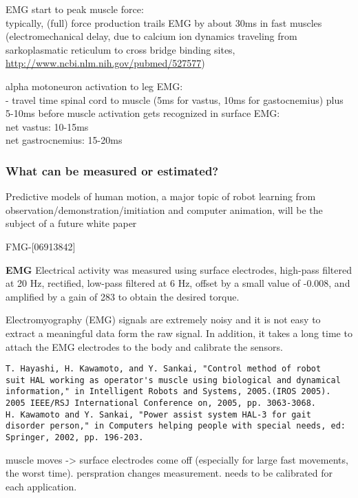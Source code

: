 \documentclass[letterpaper,12pt,fullpage]{article}
\begin{document}
EMG start to peak muscle force:\\
typically, (full) force production trails EMG by about 30ms in fast
muscles (electromechanical delay, due to calcium ion dynamics
traveling from sarkoplasmatic reticulum to cross bridge binding
sites, \url{http://www.ncbi.nlm.nih.gov/pubmed/527577})

alpha motoneuron activation to leg EMG:\\
- travel time spinal cord to muscle (5ms for vastus, 10ms for
gastocnemius) plus 5-10ms before muscle activation gets recognized in
surface EMG:\\
net vastus: 10-15ms\\
net gastrocnemius: 15-20ms

\subsubsection{What can be measured or estimated?}

Predictive models of human motion, a major topic of robot learning
from observation/demonstration/imitiation and computer animation,
will be the subject of a future white
paper~\cite{IEEE06913830,Bagnell}

FMG-[06913842]

{\bf EMG}
Electrical activity was measured using surface electrodes,
high-pass filtered at 20 Hz, rectified, low-pass filtered at 6 Hz,
offset by a small value of -0.008, and amplified by a gain of 283
to obtain the desired torque.~\cite{IEEE07139980}

Electromyography (EMG)
signals are extremely noisy and it is not easy to extract a
meaningful data form the raw signal. In addition, it takes a long
time to attach the EMG electrodes to the body and calibrate the
sensors.
\begin{verbatim}
T. Hayashi, H. Kawamoto, and Y. Sankai, "Control method of robot
suit HAL working as operator's muscle using biological and dynamical
information," in Intelligent Robots and Systems, 2005.(IROS 2005).
2005 IEEE/RSJ International Conference on, 2005, pp. 3063-3068.
H. Kawamoto and Y. Sankai, "Power assist system HAL-3 for gait
disorder person," in Computers helping people with special needs, ed:
Springer, 2002, pp. 196-203.
\end{verbatim}

muscle moves -> surface electrodes come off (especially for large fast
movements, the worst time).
perspration changes measurement. needs to be calibrated for each application.
\end{document}
